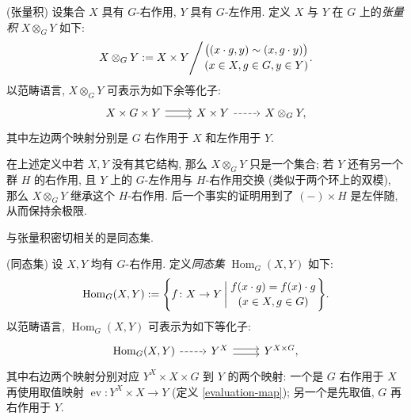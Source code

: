 \begin{definition}
    {(张量积)}
    设集合 $X$ 具有 $G$-右作用, $Y$ 具有 $G$-左作用.
    定义 $X$ 与 $Y$ 在 $G$ 上的\emph{张量积} $X\otimes_G Y$ 如下:
    $$
    X\otimes_G Y := X\times Y \Bigg/
    {
    \big(
    (x\cdot g,y)\sim (x,g\cdot y)
    \big)
    \atop
    (x\in X,g\in G,y\in Y)
    }.
    $$
    以范畴语言, $X\otimes_G Y$ 可表示为如下余等化子:
\[\begin{tikzcd}[ampersand replacement=\&]
	{X\times G\times Y} \& {X\times Y} \& {X\otimes_G Y,}
	\arrow[shift left, from=1-1, to=1-2]
	\arrow[shift right, from=1-1, to=1-2]
	\arrow[dashed, from=1-2, to=1-3]
\end{tikzcd}\]
    其中左边两个映射分别是 $G$ 右作用于 $X$ 和左作用于 $Y$.
\end{definition}

在上述定义中若 $X,Y$ 没有其它结构, 那么 $X\otimes_G Y$ 只是一个集合; 若 $Y$ 还有另一个群 $H$ 的右作用, 且 $Y$ 上的 $G$-左作用与 $H$-右作用交换 (类似于两个环上的双模), 那么 $X\otimes_G Y$ 继承这个 $H$-右作用. 后一个事实的证明用到了 $({-})\times H$ 是左伴随, 从而保持余极限.

与张量积密切相关的是同态集.

\begin{definition}
    {(同态集)}
    设 $X,Y$ 均有 $G$-右作用. 定义\emph{同态集} $\operatorname{Hom}_G(X,Y)$ 如下:
    $$
    \operatorname{Hom}_G(X,Y):=\Bigg\{
    f\colon X\to Y\,\bigg|\,
    {
    f(x\cdot g)=f(x)\cdot g
    \atop
    (x\in X,g\in G)
    }
    \Bigg\}.
    $$
    以范畴语言, $\operatorname{Hom}_G(X,Y)$ 可表示为如下等化子:
\[\begin{tikzcd}[ampersand replacement=\&]
	{\operatorname{Hom}_G(X,Y)} \& {Y^X} \& {Y^{X\times G},}
	\arrow[dashed, from=1-1, to=1-2]
	\arrow[shift left, from=1-2, to=1-3]
	\arrow[shift right, from=1-2, to=1-3]
\end{tikzcd}\]
    其中右边两个映射分别对应 $Y^X\times X\times G$ 到 $Y$ 的两个映射:
    一个是 $G$ 右作用于 $X$ 再使用取值映射 $\operatorname{ev}\colon Y^X\times X\to Y$ (定义 \ref{evaluation-map}); 另一个是先取值, $G$ 再右作用于 $Y$.
\end{definition}


